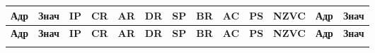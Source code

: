 \documentclass[14pt,final,oneside]{extreport}%
\begin{document}
\begin{longtable}{|>{\centering\arraybackslash}p{0.9cm}|>{\centering\arraybackslash}p{0.9cm}|>{\centering\arraybackslash}p{0.7cm}|>{\centering\arraybackslash}p{0.7cm}|>{\centering\arraybackslash}p{0.7cm}|>{\centering\arraybackslash}p{0.7cm}|>{\centering\arraybackslash}p{0.7cm}|>{\centering\arraybackslash}p{0.8cm}|>{\centering\arraybackslash}p{0.8cm}|>{\centering\arraybackslash}p{0.6cm}|>{\centering\arraybackslash}p{1.0cm}|>{\centering\arraybackslash}p{0.9cm}|>{\centering\arraybackslash}p{0.9cm}|}
\hline
\textbf{Адр} & \textbf{Знач} & \textbf{IP} & \textbf{CR} & \textbf{AR} & \textbf{DR} & \textbf{SP} & \textbf{BR} & \textbf{AC} & \textbf{PS} & \textbf{NZVC} & \textbf{Адр} & \textbf{Знач} \\
\hline
\endfirsthead

\hline
\textbf{Адр} & \textbf{Знач} & \textbf{IP} & \textbf{CR} & \textbf{AR} & \textbf{DR} & \textbf{SP} & \textbf{BR} & \textbf{AC} & \textbf{PS} & \textbf{NZVC} & \textbf{Адр} & \textbf{Знач} \\
\hline
\endhead

\endfoot

\hline
\endlastfoot


\end{longtable}
\end{document}
